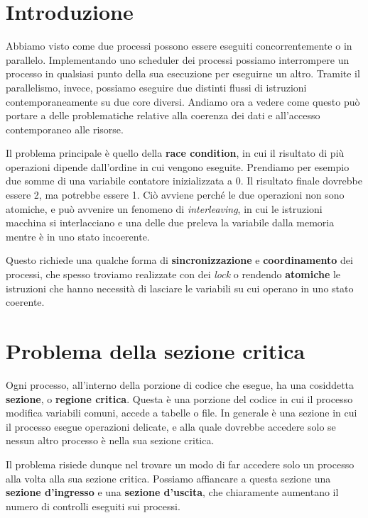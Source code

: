 \section{Introduzione}
    Abbiamo visto come due processi possono essere eseguiti concorrentemente o in parallelo. Implementando uno scheduler dei processi possiamo interrompere un processo in qualsiasi punto della sua esecuzione per eseguirne un altro. Tramite il parallelismo, invece, possiamo eseguire due distinti flussi di istruzioni contemporaneamente su due core diversi. Andiamo ora a vedere come questo può portare a delle problematiche relative alla coerenza dei dati e all'accesso contemporaneo alle risorse.
    
    Il problema principale è quello della \textbf{race condition}, in cui il risultato di più operazioni dipende dall'ordine in cui vengono eseguite. Prendiamo per esempio due somme di una variabile contatore inizializzata a 0. Il risultato finale dovrebbe essere 2, ma potrebbe essere 1. Ciò avviene perché le due operazioni non sono atomiche, e può avvenire un fenomeno di \textit{interleaving}, in cui le istruzioni macchina si interlacciano e una delle due preleva la variabile dalla memoria mentre è in uno stato incoerente.
    
    Questo richiede una qualche forma di \textbf{sincronizzazione} e \textbf{coordinamento} dei processi, che spesso troviamo realizzate con dei \textit{lock} o rendendo \textbf{atomiche} le istruzioni che hanno necessità di lasciare le variabili su cui operano in uno stato coerente.
    
\section{Problema della sezione critica}
    Ogni processo, all'interno della porzione di codice che esegue, ha una cosiddetta \textbf{sezione}, o \textbf{regione critica}. Questa è una porzione del codice in cui il processo modifica variabili comuni, accede a tabelle o file. In generale è una sezione in cui il processo esegue operazioni delicate, e alla quale dovrebbe accedere solo se nessun altro processo è nella sua sezione critica.
    
    Il problema risiede dunque nel trovare un modo di far accedere solo un processo alla volta alla sua sezione critica. Possiamo affiancare a questa sezione una \textbf{sezione d'ingresso} e una \textbf{sezione d'uscita}, che chiaramente aumentano il numero di controlli eseguiti sui processi.
    
